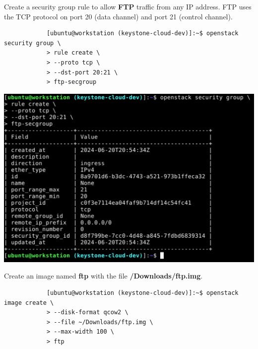 \documentclass[letterpaper, 12pt]{article}
\begin{document}
\begin{enumerate}
    \begin{labstep}
        Create a security group rule to allow \textbf{FTP} traffic from any IP address.
        FTP uses the TCP protocol on port 20 (data channel) and port 21 (control channel).
        \begin{lstlisting}
            [ubuntu@workstation (keystone-cloud-dev)]:~$ openstack security group \
            > rule create \
            > --proto tcp \
            > --dst-port 20:21 \
            > ftp-secgroup
        \end{lstlisting}

        \begin{center}
            \includegraphics[width=\linewidth]{images/part1/step35.png}
        \end{center}
    \end{labstep}

    \begin{labstep}
        Create an image named \textbf{ftp} with the file \textbf{\texttildemid/Downloads/ftp.img}.
        \begin{lstlisting}
            [ubuntu@workstation (keystone-cloud-dev)]:~$ openstack image create \
            > --disk-format qcow2 \
            > --file ~/Downloads/ftp.img \
            > --max-width 100 \
            > ftp
        \end{lstlisting}


\end{labstep}
\end{enumerate}
\end{document}
